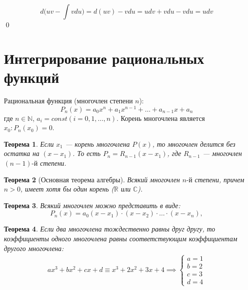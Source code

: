 \documentclass[a4paper,12pt,oneside]{extbook}
\theoremstyle{numbered}
\theoremstyle{unnumbered}
\theoremstyle{named}
\newtheorem{theorem}{Теорема}[section]
\theoremstyle{unnumbered}
\theoremstyle{named}
\theoremstyle{named}
\theoremstyle{named}
\renewenvironment{proof}{{\noindent\textbf{Доказательство.}}}{\qed}
\begin{document}
\begin{proof}
    \begin{equation}
        d\Big( uv - \int vdu \Big) = d(uv) - vdu = udv + vdu - vdu = udv
    \end{equation}
\end{proof}


\section{Интегрирование рациональных функций}%
\label{sec:Интегрирование рациональных функций}

Рациональная функция (многочлен степени \(n\)):
\begin{equation}
    P_n(x) = a_0 x^n + a_1 x^{n - 1} + \ldots + a_{n - 1} x + a_n
\end{equation}
где \(n \in \mathbb{N}\), \(a_i = const (i = 0, 1, \ldots, n)\). Корень многочлена является \(x_0: P_n(x_0) = 0\).

\begin{theorem}
    Если \(x_1\) — корень многочлена \(P(x)\), то многочлен делится без остатка на \((x - x_1)\). То есть \(P_n = R_{n - 1}(x - x_1)\), где \(R_{n - 1}\) — многочлен \((n - 1)\text{-й}\) степени.
\end{theorem}


\begin{theorem}[Основная теорема алгебры]
    Всякий многочлен \(n\text{-й}\) степени, причем \(n > 0\), имеет хотя бы один корень (\(\mathbb{R}\) или \(\mathbb{C}\)).
\end{theorem}


\begin{theorem}
    Всякий многочлен можно представить в виде:
    \[
        P_n(x) = a_0 (x - x_1) \cdot (x - x_2) \cdot \ldots \cdot (x - x_n),
    \]
\end{theorem}


\begin{theorem}
    Если два многочлена тождественно равны друг другу, то коэффициенты одного многочлена равны соответствующим коэффициентам другого многочлена:
    \begin{gather*}
        ax^3 + bx^2 + cx + d \equiv x^3 + 2x^2 + 3x + 4
        \implies
        \begin{cases}
            a = 1 \\
            b = 2 \\
            c = 3 \\
            d = 4
        \end{cases}
    \end{gather*}
\end{theorem}
\end{document}
